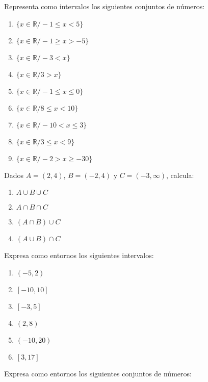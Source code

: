 \Exercicio Representa como intervalos los siguientes conjuntos de números:

\begin{enumerate}[topsep=0pt]

	\item $\{x \in \mathbb{R} / -1 \le x < 5  \} $

	\item $\{x \in \mathbb{R} / -1 \ge x > -5 \} $

	\item $\{x \in \mathbb{R} / -3 < x  \} $

	\item $\{x \in \mathbb{R} / 3 > x \} $

	\item $\{x \in \mathbb{R} / -1 \le x \le 0  \} $
	\item $\{x \in \mathbb{R} / 8 \le x < 10  \} $
	\item $\{x \in \mathbb{R} / -10 < x \le 3  \} $
	\item $\{x \in \mathbb{R} / 3 \le x < 9  \} $
	\item $\{x \in \mathbb{R} / -2 > x \ge -30  \} $
\end{enumerate}


\Exercicio Dados $A=(2,4)$, $B=(-2,4)$ y $C=(-3, \infty)$, calcula:

\begin{enumerate}[topsep=0pt]

	\item $A \cup B \cup C$

	\item $A \cap B \cap C$

	\item $(A \cap B) \cup C$

	\item $(A \cup B) \cap C$

\end{enumerate}


\Exercicio Expresa como entornos los siguientes intervalos:
\begin{enumerate}[topsep=0pt]
	\item $(-5, 2)$
	\item $[-10, 10]$
	\item $[-3, 5]$
	\item $(2,8)$
	\item $(-10, 20)$
	\item $[3,17]$
\end{enumerate}

\Exercicio Expresa como entornos los siguientes conjuntos de números:

